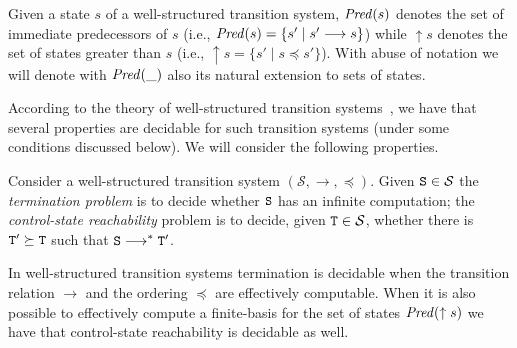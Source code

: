 \documentclass{LMCS}
\newcommand{\cal}{\mathcal}
\theoremstyle{plain}\newtheorem{proposition}[thm]{Proposition}
\theoremstyle{plain}\newtheorem{lemma}[thm]{Lemma}
\theoremstyle{plain}\newtheorem{theorem}[thm]{Theorem}
\theoremstyle{plain}\newtheorem{corollary}[thm]{Corollary}
\newcommand{\State}{{\tt S}}
\newcommand{\StateT}{{\tt T}}
\newcommand{\lred}[1]{\stackrel{#1}{\longrightarrow}}
\newcommand{\pred}[1]{{\it Pred}(#1)}
\begin{document}
\noindent Given a state $s$ of a well-structured transition system, $\pred{s}$
denotes the set of immediate predecessors of $s$ (i.e., $\pred{s}=\{s'\; |\; s' \lred{} s\}$)
while $\uparrow s$ denotes the set of states greater than $s$ (i.e., $\uparrow s=
\{ s' \; | \; s \preceq s'\}$). With abuse of notation we will denote with $\pred{\_}$
also its natural extension to sets of states.


According to the theory of well-structured transition systems~\cite{abdulla:96,Finkel:2001},
we have that several properties are decidable for such transition systems
(under some conditions discussed below).
We will consider the following properties. 
\begin{defi}
\label{def.otherproblems}
Consider a well-structured transition system $({\cal S}, \lred{}, \preceq)$.
Given $\State \in {\cal S}$ the \emph{termination problem} is to 
decide whether $\State$ has an infinite computation;
the \emph{control-state reachability} problem is to decide,
given $\StateT \in {\cal S}$, whether there is $\StateT' \succeq \StateT$ 
such that $\State \lred{}^* \StateT'$.
\end{defi}
In well-structured transition systems termination is decidable when
the transition relation $\lred{}$ and the ordering $\preceq$ are
effectively computable. When it is also possible to effectively compute
a finite-basis for the set of states $\pred{\uparrow s}$ we have that 
control-state reachability is decidable as well. 
\end{document}
